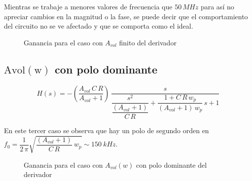 \documentclass[11pt, a4paper]{article}
\begin{document}
Mientras se trabaje a menores valores de frecuencia que $50 \, MHz$ para así no apreciar cambios en la magnitud o la fase, se puede decir que el comportamiento del circuito no se ve afectado y que se comporta como el ideal. 

\begin{figure}[H]
	\begin{center}
		\caption{Ganancia para el caso con $A_{vol}$ finito del derivador}
		\label{avolfinitoderivador}
	\end{center}
\end{figure}

\subsection{$\mathrm{A{vol}(w)}$ con polo dominante}

\begin{equation}
H(s) = - \left( \dfrac{A_{vol} \,C \,R}{A_{vol} + 1} \right) \, \dfrac{s}{ \dfrac{s^2}{\dfrac{(A_{vol}+1)}{C \,R}} + \dfrac{1+ C \,R \,w_p}{(A_{vol} + 1) \,w_p} \,s + 1} 
\end{equation}

En este tercer caso se observa que hay un polo de segundo orden en $f_0 = \dfrac{1}{2 \,\pi} \sqrt{\dfrac{(A_{vol}+1)}{C \,R} \ w_p} \sim 150 \ kHz$.

\begin{figure}[H]
	\begin{center}
		\caption{Ganancia para el caso con $A_{vol}(w)$ con polo dominante del derivador}
		\label{avolpolodominantederivador}
	\end{center}
\end{figure}
\end{document}
